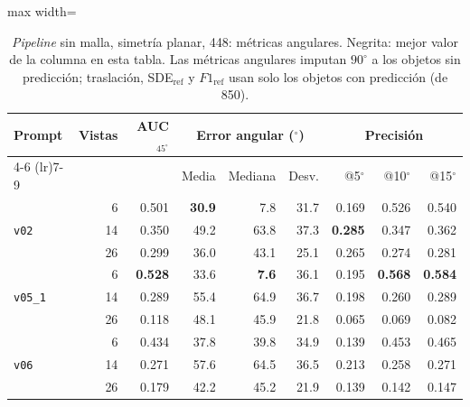 
\begin{table}[htbp]
\centering
\caption{\textit{Pipeline} sin malla, simetría planar, 448: métricas angulares. Negrita: mejor valor de la columna en esta tabla. Las métricas angulares imputan $90^\circ$ a los objetos sin predicción; traslación, SDE$_{\mathrm{ref}}$ y $F1_{\mathrm{ref}}$ usan solo los objetos con predicción (de 850).}
\label{tab:plane_448_angular}
\begin{adjustbox}{max width=\textwidth}
\begin{tabular}{lrrrrrrrr}
\toprule
\multirow{2}{*}{Prompt} & \multirow{2}{*}{Vistas} & \multirow{2}{*}{AUC$_{45^\circ}$} & \multicolumn{3}{c}{Error angular ($^\circ$)} & \multicolumn{3}{c}{Precisión} \\
\cmidrule(lr){4-6} \cmidrule(lr){7-9}
 &  &  & Media & Mediana & Desv. & @5$^\circ$ & @10$^\circ$ & @15$^\circ$ \\
\midrule
\multirow{3}{*}{\texttt{v02}} & 6 & 0.501 & \textbf{30.9} & 7.8 & 31.7 & 0.169 & 0.526 & 0.540 \\
 & 14 & 0.350 & 49.2 & 63.8 & 37.3 & \textbf{0.285} & 0.347 & 0.362 \\
 & 26 & 0.299 & 36.0 & 43.1 & 25.1 & 0.265 & 0.274 & 0.281 \\
\midrule
\multirow{3}{*}{\texttt{v05\_1}} & 6 & \textbf{0.528} & 33.6 & \textbf{7.6} & 36.1 & 0.195 & \textbf{0.568} & \textbf{0.584} \\
 & 14 & 0.289 & 55.4 & 64.9 & 36.7 & 0.198 & 0.260 & 0.289 \\
 & 26 & 0.118 & 48.1 & 45.9 & 21.8 & 0.065 & 0.069 & 0.082 \\
\midrule
\multirow{3}{*}{\texttt{v06}} & 6 & 0.434 & 37.8 & 39.8 & 34.9 & 0.139 & 0.453 & 0.465 \\
 & 14 & 0.271 & 57.6 & 64.5 & 36.5 & 0.213 & 0.258 & 0.271 \\
 & 26 & 0.179 & 42.2 & 45.2 & 21.9 & 0.139 & 0.142 & 0.147 \\
\bottomrule
\end{tabular}
\end{adjustbox}
\end{table}

